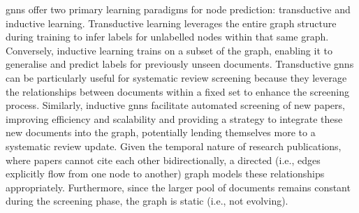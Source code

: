 \documentclass[10pt,oneside]{book}
\begin{document}
\glspl*{gnn} offer two primary learning paradigms for node prediction: transductive and inductive learning. Transductive learning leverages the entire graph structure during training to infer labels for unlabelled nodes within that same graph. Conversely, inductive learning trains on a subset of the graph, enabling it to generalise and predict labels for previously unseen documents. Transductive \glspl*{gnn} can be particularly useful for systematic review screening because they leverage the relationships between documents within a fixed set to enhance the screening process. Similarly, inductive \gls*{gnn}s facilitate automated screening of new papers, improving efficiency and scalability and providing a strategy to integrate these new documents into the graph, potentially lending themselves more to a systematic review update. Given the temporal nature of research publications, where papers cannot cite each other bidirectionally, a directed (i.e., edges explicitly flow from one node to another) graph models these relationships appropriately. Furthermore, since the larger pool of documents remains constant during the screening phase, the graph is static (i.e., not evolving).
\end{document}
